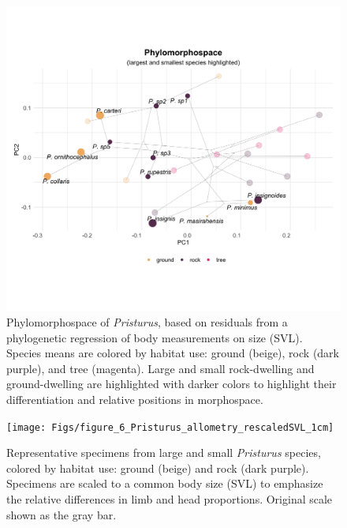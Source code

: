 \documentclass[
  11pt,
]{article}
\begin{document}
\begin{figure}

{\centering \includegraphics[width=1\linewidth]{Figs/figure_5_phylomorphospace_large_small} 

}

\caption{Phylomorphospace of \textit{Pristurus}, based on residuals from a phylogenetic regression of body measurements on size (SVL). Species means are colored by habitat use: ground (beige), rock (dark purple), and tree (magenta). Large and small rock-dwelling and ground-dwelling are highlighted with darker colors to highlight their differentiation and relative positions in morphospace.}\label{fig:unnamed-chunk-8}
\end{figure}

\newpage

\begin{figure}

{\centering \texttt{[image: Figs/figure\_6\_Pristurus\_allometry\_rescaledSVL\_1cm]} 

}

\caption{Representative specimens from large and small \textit{Pristurus} species, colored by habitat use: ground (beige) and rock (dark purple). Specimens are scaled to a common body size (SVL) to emphasize the relative differences in limb and head proportions. Original scale shown as the gray bar.}\label{fig:unnamed-chunk-9}
\end{figure}
\end{document}
